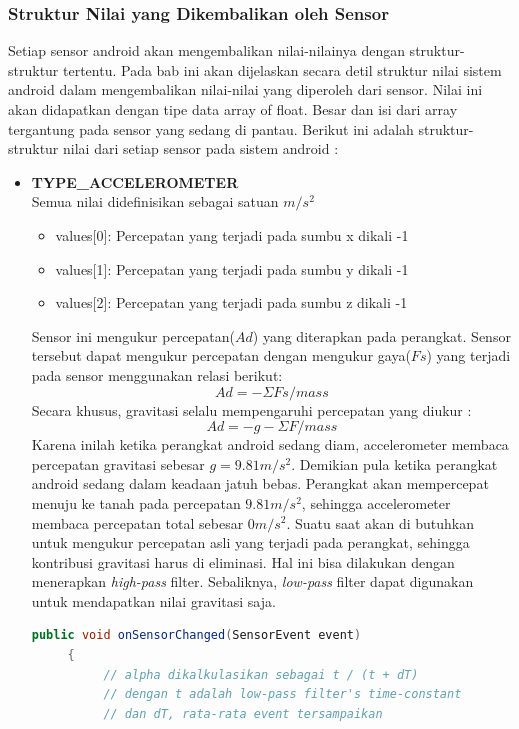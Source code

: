 \subsubsection{Struktur Nilai yang Dikembalikan oleh Sensor}
\label{sssec:struktur_nilai_yang_dikembalikan_oleh_sensor}
Setiap sensor android akan mengembalikan nilai-nilainya dengan struktur-struktur tertentu. Pada bab ini akan dijelaskan secara detil struktur nilai sistem android dalam mengembalikan nilai-nilai yang diperoleh dari sensor. Nilai ini akan didapatkan dengan tipe data array of float. Besar dan isi dari array tergantung pada sensor yang sedang di pantau. Berikut ini adalah struktur-struktur nilai dari setiap sensor pada sistem android :\\
\begin{itemize}
	\item \textbf{TYPE\_ACCELEROMETER}\\
Semua nilai didefinisikan sebagai satuan \(m/s^2\)
\begin{itemize}
	\item values[0]: Percepatan yang terjadi pada sumbu x dikali -1
	\item values[1]: Percepatan yang terjadi pada sumbu y dikali -1
	\item values[2]: Percepatan yang terjadi pada sumbu z dikali -1
\end{itemize}
Sensor ini mengukur percepatan(\(Ad\)) yang diterapkan pada perangkat. Sensor tersebut dapat mengukur percepatan dengan mengukur gaya(\(Fs\)) yang terjadi pada sensor menggunakan relasi berikut:
\[
	Ad = -\Sigma Fs / mass
\]
Secara khusus, gravitasi selalu mempengaruhi percepatan yang diukur :
\[
	Ad =  -g -\Sigma F / mass
\]
Karena inilah ketika perangkat android sedang diam, accelerometer membaca percepatan gravitasi sebesar \(g = 9.81m/s^2\).
Demikian pula ketika perangkat android sedang dalam keadaan jatuh bebas. Perangkat akan mempercepat menuju ke tanah pada percepatan \(9.81 m/s^2\), sehingga accelerometer membaca percepatan total sebesar \( 0 m/s^2\). 
Suatu saat akan di butuhkan untuk mengukur percepatan asli yang terjadi pada perangkat, sehingga kontribusi gravitasi harus di eliminasi. Hal ini bisa dilakukan dengan menerapkan \textit{high-pass} filter. Sebaliknya, \textit{low-pass} filter dapat digunakan untuk mendapatkan nilai gravitasi saja. 
\begin{lstlisting}[caption={Implementasi \textit{low-pass} filter},label={lst:low-pass-filter},language=java]
	 public void onSensorChanged(SensorEvent event)
     {
          // alpha dikalkulasikan sebagai t / (t + dT)
          // dengan t adalah low-pass filter's time-constant
          // dan dT, rata-rata event tersampaikan


\end{lstlisting}
\end{itemize}
